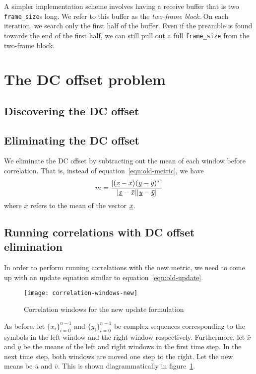 A simpler implementation scheme involves having a receive buffer that is two
\verb+frame_size+s long. We refer to this buffer as the \emph{two-frame block}.
On each iteration, we search only the first half of the buffer. Even if the
preamble is found towards the end of the first half, we can still pull out a
full \verb+frame_size+ from the two-frame block.


\section{The DC offset problem}

\subsection{Discovering the DC offset}
\subsection{Eliminating the DC offset}

We eliminate the DC offset by subtracting out the mean of each window before
correlation. That is, instead of equation~\ref{eqn:old-metric}, we have
\begin{equation} \label{eqn:new-metric}
	m = \frac{|\corr{(\ue{x}-\bar{x})}{(\ue{y}-\bar{y})}|}
	         {|\ue{x}-\bar{x}||\ue{y}-\bar{y}|}
\end{equation}
where $\bar{x}$ refers to the mean of the vector $\underbar{\emph{x}}$.

\subsection{Running correlations with DC offset elimination}

In order to perform running correlations with the new metric, we need to
come up with an update equation similar to equation~\ref{eqn:old-update}.

\begin{figure}[h]
	\centering
	\texttt{[image: correlation-windows-new]}
	\caption{Correlation windows for the new update formulation}
	\label{fig:corr-win-new}
\end{figure}

As before, let $\{x_i\}_{i=0}^{n-1}$ and $\{y_i\}_{i=0}^{n-1}$ be complex
sequences corresponding to the symbols in the left window and the right window
respectively. Furthermore, let $\bar{x}$ and $\bar{y}$ be the means of the
left and right windows in the first time step. In the next time step, both
windows are moved one step to the right. Let the new means be $\bar{u}$ and
$\bar{v}$. This is shown diagrammatically in figure~\ref{fig:corr-win-new}.

